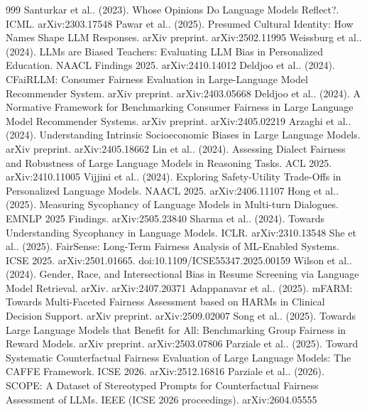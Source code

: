 \documentclass[10pt]{article}
\begin{document}
\begin{thebibliography}{999}
 Santurkar et al.. (2023). Whose Opinions Do Language Models Reflect?. ICML. arXiv:2303.17548
 Pawar et al.. (2025). Presumed Cultural Identity: How Names Shape LLM Responses. arXiv preprint. arXiv:2502.11995
 Weissburg et al.. (2024). LLMs are Biased Teachers: Evaluating LLM Bias in Personalized Education. NAACL Findings 2025. arXiv:2410.14012
 Deldjoo et al.. (2024). CFaiRLLM: Consumer Fairness Evaluation in Large-Language Model Recommender System. arXiv preprint. arXiv:2403.05668
 Deldjoo et al.. (2024). A Normative Framework for Benchmarking Consumer Fairness in Large Language Model Recommender Systems. arXiv preprint. arXiv:2405.02219
 Arzaghi et al.. (2024). Understanding Intrinsic Socioeconomic Biases in Large Language Models. arXiv preprint. arXiv:2405.18662
 Lin et al.. (2024). Assessing Dialect Fairness and Robustness of Large Language Models in Reasoning Tasks. ACL 2025. arXiv:2410.11005
 Vijjini et al.. (2024). Exploring Safety-Utility Trade-Offs in Personalized Language Models. NAACL 2025. arXiv:2406.11107
 Hong et al.. (2025). Measuring Sycophancy of Language Models in Multi-turn Dialogues. EMNLP 2025 Findings. arXiv:2505.23840
 Sharma et al.. (2024). Towards Understanding Sycophancy in Language Models. ICLR. arXiv:2310.13548
 She et al.. (2025). FairSense: Long-Term Fairness Analysis of ML-Enabled Systems. ICSE 2025. arXiv:2501.01665. doi:10.1109/ICSE55347.2025.00159
 Wilson et al.. (2024). Gender, Race, and Intersectional Bias in Resume Screening via Language Model Retrieval. arXiv. arXiv:2407.20371
 Adappanavar et al.. (2025). mFARM: Towards Multi-Faceted Fairness Assessment based on HARMs in Clinical Decision Support. arXiv preprint. arXiv:2509.02007
 Song et al.. (2025). Towards Large Language Models that Benefit for All: Benchmarking Group Fairness in Reward Models. arXiv preprint. arXiv:2503.07806
 Parziale et al.. (2025). Toward Systematic Counterfactual Fairness Evaluation of Large Language Models: The CAFFE Framework. ICSE 2026. arXiv:2512.16816
 Parziale et al.. (2026). SCOPE: A Dataset of Stereotyped Prompts for Counterfactual Fairness Assessment of LLMs. IEEE (ICSE 2026 proceedings). arXiv:2604.05555

\end{thebibliography}
\end{document}
